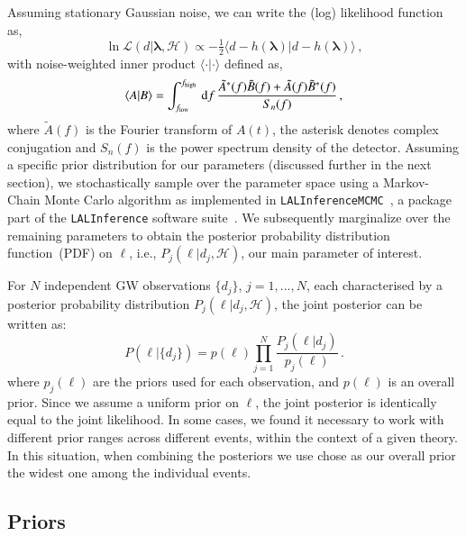 \documentclass[twocolumn,
               prd,
               aps,
               superscriptaddress,
               tightenlines,
               nofootinbib,
               eqsecnum,
               amsfonts,
               amsmath,
               longbibliography]{revtex4-1}
\newcommand{\dd}{{\rm d}}
\begin{document}
Assuming stationary Gaussian noise, we can write the (log) likelihood function as,
%
\begin{equation}
\ln \mathcal{L}(d \vert \bm{\lambda},\mathcal{H}) \propto
- \tfrac{1}{2}
\langle
d - h(\bm{\lambda}) \vert d - h(\bm{\lambda})
\rangle\,,
\end{equation}
%
with noise-weighted inner product $\langle \cdot | \cdot \rangle$ defined as,
%
\begin{equation}
\langle A | B \rangle =
\int_{f_{\rm low}}^{f_{\rm high}} \, \dd f \,
\frac{\tilde{A}^{\ast}(f) \tilde{B}(f) + \tilde{A}(f) \tilde{B}^{\ast}(f)}{S_{n}(f)}\,,
\end{equation}
%
where $\tilde{A}(f)$ is the Fourier transform of $A(t)$, the asterisk denotes
complex conjugation and $S_{n}(f)$ is the power spectrum density of the
detector.
%
Assuming a specific prior distribution for our parameters (discussed further in the next section), we stochastically
sample over the parameter space using a Markov-Chain Monte Carlo algorithm as implemented in
\texttt{LALInferenceMCMC}~\cite{Rover:2006ni,vanderSluys:2008qx},
a package part of the \texttt{LALInference} software suite~\cite{Veitch:2014wba,lalsuite}.
%
We subsequently marginalize over the remaining parameters to obtain the
posterior probability distribution function~(PDF) on $\ell$,  i.e., $P_j(\ell \vert d_j,\mathcal{H})$,
our main parameter of interest.

For $N$ independent GW observations $\{d_j\}$, $j=1,...,N$, each characterised
by a posterior probability distribution $P_j(\ell \vert d_j,\mathcal{H})$, the
joint posterior can be written as:
%
\begin{equation}
P(\ell | \{d_j\}) = p(\ell) \prod_{j=1}^{N} \frac{P_j(\ell | d_j)}{p_j(\ell)}\,.
\label{eq:cumulative_dist_ell}
\end{equation}
%
where $p_j(\ell)$ are the priors used for each observation, and $p(\ell)$ is an overall prior.
%
Since we assume a uniform prior on $\ell$, the joint posterior is identically
equal to the joint likelihood.
%
In some cases, we found it necessary to work with different prior ranges across
different events, within the context of a given theory.
%
In this situation, when combining the posteriors we use chose as our overall
prior the widest one among the individual events.

\subsection{Priors}
\end{document}
